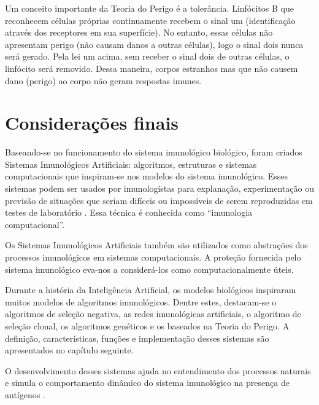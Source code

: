 Um conceito importante da Teoria do Perigo é a tolerância. Linfócitos B que reconhecem células próprias continuamente recebem o sinal um (identificação através dos receptores em sua superfície). No entanto, essas células não apresentam perigo (não causam danos a outras células), logo o sinal dois nunca será gerado. Pela lei um acima, sem receber o sinal dois de outras células, o linfócito será removido. Dessa maneira, corpos estranhos mas que não causem dano (perigo) ao corpo não geram respostas imunes.

\section{Considerações finais}

Baseando-se no funcionamento do sistema imunológico biológico, foram criados Sistemas Imunológicos Artificiais: algoritmos, estruturas e sistemas computacionais que inspiram-se nos modelos do sistema imunológico. Esses sistemas podem ser usados por imunologistas para explanação, experimentação ou previsão de situações que seriam difíceis ou impossíveis de serem reproduzidas em testes de laboratório \cite{Garrett2005}. Essa técnica é conhecida como ``imunologia computacional''.

Os Sistemas Imunológicos Artificiais também são utilizados como abstrações dos processos imunológicos em sistemas computacionais. A proteção fornecida pelo sistema imunológico eva-nos a considerá-los como computacionalmente úteis.

Durante a história da Inteligência Artificial, os modelos biológicos inspiraram muitos modelos de algoritmos imunológicos. Dentre estes, destacam-se o algoritmos de seleção negativa, as redes imunológicas artificiais, o algoritmo de seleção clonal, os algoritmos genéticos e os baseados na Teoria do Perigo. A definição, características, funções e implementação desses sistemas são apresentados no capítulo seguinte.

O desenvolvimento desses sistemas ajuda no entendimento dos processos naturais e simula o comportamento dinâmico do sistema imunológico na presença de antígenos \cite{Dasgupta2006}.
